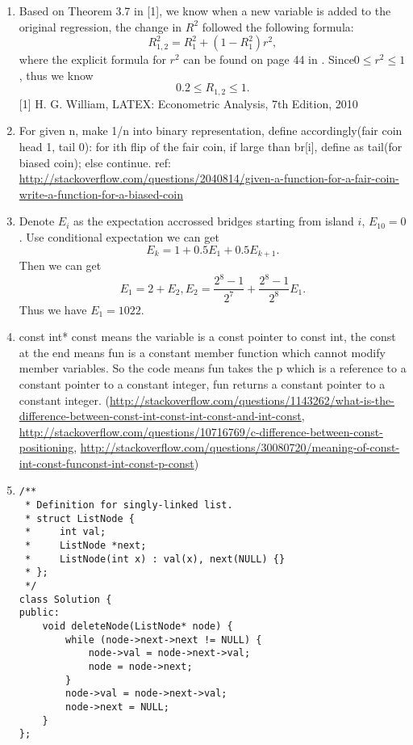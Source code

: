\documentclass[10pt]{article}
\begin{document}
\begin{enumerate}
\begin{enumerate}
\end{enumerate}

\item %
Based on Theorem 3.7 in [1], we know when a new variable is added to the original regression, the change in $R^{2}$ followed the following formula:
\begin{equation}
R_{1,2}^{2}=R_{1}^{2} + (1-R_{1}^{2})r^{2}, 
\end{equation}
where the explicit formula for $r^{2}$ can be found on page 44 in \cite{es}. Since$0\leq r^{2}\leq 1$, thus we know
\begin{equation}
0.2\leq R_{1,2}\leq 1.
\end{equation}
[1] H. G. William, LATEX: Econometric Analysis, 7th Edition, 2010

\item %
For given n, make 1/n into binary representation, define accordingly(fair coin head 1, tail 0):
    for ith flip of the fair coin, if large than br[i], define as tail(for biased coin); else continue.
ref: \url{http://stackoverflow.com/questions/2040814/given-a-function-for-a-fair-coin-write-a-function-for-a-biased-coin}

\item %
Denote $E_i$ as the expectation accrossed bridges starting from island $i$, $E_{10}=0$. Use conditional expectation we can get
$$E_k=1+0.5E_1+0.5E_{k+1}.$$
Then we can get
$$E_1=2+E_2,  E_2=\frac{2^8-1}{2^7}+\frac{2^8-1}{2^8}E_1.$$
Thus we have $E_1=1022.$
\item %
const int* const means the variable is a const pointer to const int, the const at the end means fun is a constant member function which cannot modify member variables. So the code means fun takes the p which is a reference to a constant pointer to a constant integer, fun returns a constant pointer to a constant integer.
(\url{http://stackoverflow.com/questions/1143262/what-is-the-difference-between-const-int-const-int-const-and-int-const}, \url{http://stackoverflow.com/questions/10716769/c-difference-between-const-positioning}, \url{http://stackoverflow.com/questions/30080720/meaning-of-const-int-const-funconst-int-const-p-const})
\item %

\begin{lstlisting}
/**
 * Definition for singly-linked list.
 * struct ListNode {
 *     int val;
 *     ListNode *next;
 *     ListNode(int x) : val(x), next(NULL) {}
 * };
 */
class Solution {
public:
    void deleteNode(ListNode* node) {
        while (node->next->next != NULL) {
            node->val = node->next->val;
            node = node->next;
        }
        node->val = node->next->val;
        node->next = NULL;
    }
};


\end{lstlisting}
\end{enumerate}
\end{document}

